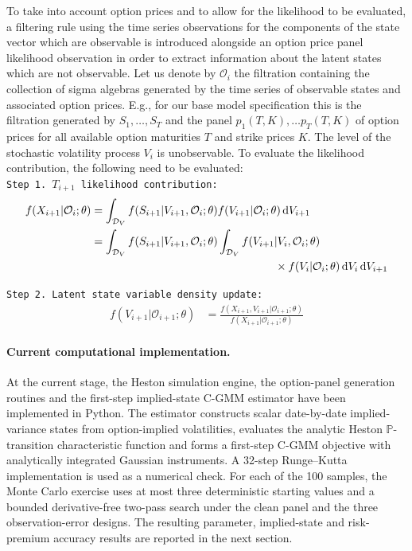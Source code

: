 \documentclass[11pt,a4paper,notitlepage]{article}
\numberwithin{equation}{section}
\begin{document}
To take into account option prices and to allow for the likelihood to be evaluated, a filtering rule using the time series observations for the components of the state vector which are observable is introduced alongside an option price panel likelihood observation in order to extract information about the latent states which are not observable.  Let us denote by $\mathcal{O}_i$ the filtration containing the collection of sigma algebras generated by the time series of observable states and associated option prices. E.g., for our base model specification this is the filtration generated by $S_{1},\dots,S_{T}$ and the panel $p_{1}(T,K),\dots  p_{T}(T,K)$ of option prices for all available option maturities $T$ and strike prices $K$. The level of the stochastic volatility process $V_{i}$ is unobservable. To evaluate the likelihood contribution, the following need to be evaluated:\vspace{+5pt}\\
\texttt{Step 1. $T_{i+1}$ likelihood contribution:} \vspace{-5pt}
\begin{align}
f(X_{i+1}|\mathcal{O}_{i};\theta) &=\int_{\mathcal{D}_{V}}  f(S_{i+1}|{V}_{i+1},\mathcal{O}_i;\theta) f(V_{i+1}|\mathcal{O}_i;\theta) \dif{V_{i+1}} \notag\\
&=\int_{\mathcal{D}_{V}} f(S_{i+1}|{V}_{i+1},\mathcal{O}_i; \theta) \int_{\mathcal{D}_{V}} f(V_{i+1}|{V}_{i},\mathcal{O}_i;\theta) \notag \\
& \hspace{165pt} \times f(V_{i}|\mathcal{O}_i; \theta)  \dif V_{i} \dif{V_{i+1}}\label{LikelihoodContribTheo}
\end{align}

\texttt{Step 2. Latent state variable density update:}\vspace{-5pt}
\begin{align}
f(V_{i+1}|\mathcal{O}_{i+1}; \theta) &= \frac{f(X_{i+1},V_{i+1}|\mathcal{O}_{i+1}; \theta)}{f(X_{i+1}|\mathcal{O}_{i+1}; \theta)} \label{SamplingDensityTheo}
\end{align}
%
\paragraph{Current computational implementation.}
At the current stage, the Heston simulation engine, the option-panel generation routines and the first-step implied-state C-GMM estimator have been implemented in Python. The estimator constructs scalar date-by-date implied-variance states from option-implied volatilities, evaluates the analytic Heston $\mathbb{P}$-transition characteristic function and forms a first-step C-GMM objective with analytically integrated Gaussian instruments. A 32-step Runge--Kutta implementation is used as a numerical check. For each of the 100 samples, the Monte Carlo exercise uses at most three deterministic starting values and a bounded derivative-free two-pass search under the clean panel and the three observation-error designs. The resulting parameter, implied-state and risk-premium accuracy results are reported in the next section.
\end{document}
